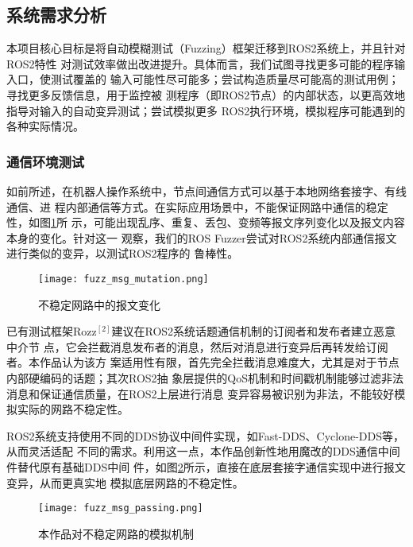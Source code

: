\subsection{系统需求分析}
\setParDis %
本项目核心目标是将自动模糊测试（Fuzzing）框架迁移到ROS2系统上，并且针对ROS2特性
对测试效率做出改进提升。具体而言，我们试图寻找更多可能的程序输入口，使测试覆盖的
输入可能性尽可能多；尝试构造质量尽可能高的测试用例；寻找更多反馈信息，用于监控被
测程序（即ROS2节点）的内部状态，以更高效地指导对输入的自动变异测试；尝试模拟更多
ROS2执行环境，模拟程序可能遇到的各种实际情况。

\subsubsection{通信环境测试}

如前所述，在机器人操作系统中，节点间通信方式可以基于本地网络套接字、有线通信、进
程内部通信等方式。在实际应用场景中，不能保证网路中通信的稳定性，如图\ref{pic:fmm}所
示，可能出现乱序、重复、丢包、变频等报文序列变化以及报文内容本身的变化。针对这一
观察，我们的ROS Fuzzer尝试对ROS2系统内部通信报文进行类似的变异，以测试ROS2程序的
鲁棒性。

\begin{figure}[h]
    \centering
    \texttt{[image: fuzz\_msg\_mutation.png]}
    \caption{不稳定网路中的报文变化}
    \label{pic:fmm}
\end{figure}

已有测试框架Rozz$^{[2]}$建议在ROS2系统话题通信机制的订阅者和发布者建立恶意中介节
点，它会拦截消息发布者的消息，然后对消息进行变异后再转发给订阅者。本作品认为该方
案适用性有限，首先完全拦截消息难度大，尤其是对于节点内部硬编码的话题；其次ROS2抽
象层提供的QoS机制和时间戳机制能够过滤非法消息和保证通信质量，在ROS2上层进行消息
变异容易被识别为非法，不能较好模拟实际的网路不稳定性。

ROS2系统支持使用不同的DDS协议中间件实现，如Fast-DDS、Cyclone-DDS等，从而灵活适配
不同的需求。利用这一点，本作品创新性地用魔改的DDS通信中间件替代原有基础DDS中间
件，如图\ref{pic:fmp}所示，直接在底层套接字通信实现中进行报文变异，从而更真实地
模拟底层网路的不稳定性。

\begin{figure}[h]
    \centering
    \texttt{[image: fuzz\_msg\_passing.png]}
    \caption{本作品对不稳定网路的模拟机制}
    \label{pic:fmp}
\end{figure}

